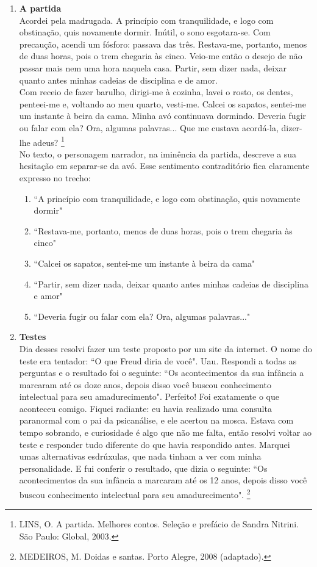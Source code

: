 \documentclass[10pt,a4paper]{article}
\begin{document}
\begin{multicols}{2}
\begin{enumerate}
	\item \textbf{A partida}\\
		Acordei pela madrugada. A princ\'ipio com tranquilidade, e logo com obstina\c{c}\~ao, quis novamente dormir. In\'util, o sono esgotara-se. Com precau\c{c}\~ao, acendi um f\'osforo: passava das tr\^es. Restava-me, portanto, menos de duas horas, pois o trem chegaria \`as cinco. Veio-me ent\~ao o desejo de n\~ao passar mais nem uma hora naquela casa. Partir, sem dizer nada, deixar quanto antes minhas cadeias de disciplina e de amor.\\
	Com receio de fazer barulho, dirigi-me \`a cozinha, lavei o rosto, os dentes, penteei-me e, voltando ao meu quarto, vesti-me. Calcei os sapatos, sentei-me um instante \`a beira da cama. Minha av\'o continuava dormindo. Deveria fugir ou falar com ela? Ora, algumas palavras... Que me custava acord\'a-la, dizer-lhe adeus? \footnote{LINS, O. A partida. Melhores contos. Sele\c{c}\~ao e pref\'acio de Sandra Nitrini. S\~ao Paulo: Global, 2003.} \\

		
	No texto, o personagem narrador, na imin\^encia da partida, descreve a sua hesita\c{c}\~ao em separar-se da av\'o. Esse sentimento contradit\'orio fica claramente expresso no trecho:

		\begin{enumerate}
		\item ``A princ\'ipio com tranquilidade, e logo com obstina\c{c}\~ao, quis novamente dormir"
		\item ``Restava-me, portanto, menos de duas horas, pois o trem chegaria \`as cinco"
		\item ``Calcei os sapatos, sentei-me um instante \`a beira da cama"
		\item ``Partir, sem dizer nada, deixar quanto antes minhas cadeias de disciplina e amor"
		\item ``Deveria fugir ou falar com ela? Ora, algumas palavras..."
		\end{enumerate}

	\item \textbf{ Testes} \\
		Dia desses resolvi fazer um teste proposto por um site da internet. O nome do teste era tentador: ``O que Freud diria de voc\^e". Uau. Respondi a todas as perguntas e o resultado foi o seguinte: ``Os acontecimentos da sua infância a marcaram at\'e os doze anos, depois disso voc\^e buscou conhecimento intelectual para seu amadurecimento". Perfeito! Foi exatamente o que aconteceu comigo. Fiquei radiante: eu havia realizado uma consulta paranormal com o pai da psican\'alise, e ele acertou na mosca. Estava com tempo sobrando, e curiosidade \'e algo que n\~ao me falta, ent\~ao resolvi voltar ao teste e responder tudo diferente do que havia respondido antes. Marquei umas alternativas esdr\'uxulas, que nada tinham a ver com minha personalidade. E fui conferir o resultado, que dizia o seguinte: ``Os acontecimentos da sua infância a marcaram at\'e os 12 anos, depois disso voc\^e buscou conhecimento intelectual para seu amadurecimento".
\footnote{MEDEIROS, M. Doidas e santas. Porto Alegre, 2008 (adaptado).} \\


\end{enumerate}
\end{multicols}
\end{document}
